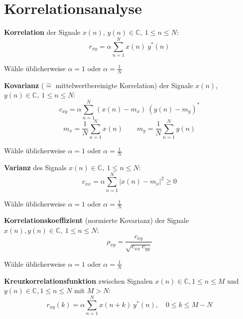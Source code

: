 \documentclass[10pt,a4paper]{article}
\begin{document}
\section*{Korrelationsanalyse}
\begin{multicols}{2}
	\begin{adjustbox}{valign=t,center=0.48\textwidth,margin=1ex,minipage=[t][][t]{0.43\textwidth},bgcolor=white,cfbox=black 1.5pt 0pt 1pt}
		\textbf{Korrelation} der Signale $x(n)$, $y(n) \in \mathbb C, ~ 1 \leq n \leq N$:
		\[ r_{xy} = \alpha \sum_{n = 1}^N x(n) ~ y^*(n) \]

		Wähle üblicherweise $\alpha = 1$ oder $\alpha = \frac{1}{N}$
	\end{adjustbox}

	\begin{adjustbox}{valign=t,center=0.48\textwidth,margin=1ex,minipage=[t][][t]{0.43\textwidth},bgcolor=white,cfbox=black 1.5pt 0pt 1pt}
		\textbf{Kovarianz} ($\hat =$ mittelwertbereinigte Korrelation) der Signale $x(n)$, $y(n) \in \mathbb C, ~ 1 \leq n \leq N$:
		\[ c_{xy} = \alpha \sum_{n = 1}^N (x(n) - m_x) ~ (y(n) - m_y)^* \]
		\[ m_x = \frac{1}{N} \sum_{n = 1}^N x(n) \qquad m_y = \frac{1}{N} \sum_{n = 1}^N y(n) \]

		Wähle üblicherweise $\alpha = 1$ oder $\alpha = \frac{1}{N}$
	\end{adjustbox}

	\begin{adjustbox}{valign=t,center=0.48\textwidth,margin=1ex,minipage=[t][][t]{0.43\textwidth},bgcolor=white,cfbox=black 1.5pt 0pt 1pt}
		\textbf{Varianz} des Signals $x(n) \in \mathbb C, ~ 1 \leq n \leq N$:
		\[ c_{xx} = \alpha \sum_{n = 1}^N \left| x(n) - m_x \right|^2 \geq 0 \]

		Wähle üblicherweise $\alpha = 1$ oder $\alpha = \frac{1}{N}$
	\end{adjustbox}

	\begin{adjustbox}{valign=t,center=0.48\textwidth,margin=1ex,minipage=[t][][t]{0.43\textwidth},bgcolor=white,cfbox=black 1.5pt 0pt 1pt}
		\textbf{Korrelationskoeffizient} (normierte Kovarianz) der Signale $x(n), y(n) \in \mathbb C, ~ 1 \leq n \leq N$:
		\[ \rho_{xy} = \frac{c_{xy}}{\sqrt{c_{xx} ~ c_{yy}}} \]

		Wähle üblicherweise $\alpha = 1$ oder $\alpha = \frac{1}{N}$
	\end{adjustbox}

	\begin{adjustbox}{valign=t,center=0.48\textwidth,margin=1ex,minipage=[t][][t]{0.43\textwidth},bgcolor=white,cfbox=black 1.5pt 0pt 1pt}
		\textbf{Kreuzkorrelationsfunktion} zwischen Signalen $x(n) \in \mathbb C, 1 \leq n \leq M$ und $y(n) \in \mathbb C, 1 \leq n \leq N$ mit $M > N$:
		\[ r_{xy}(k) = \alpha \sum_{n = 1}^N x(n + k) ~ y^*(n), \quad 0 \leq k \leq M - N \]


\end{adjustbox}
\end{multicols}
\end{document}
